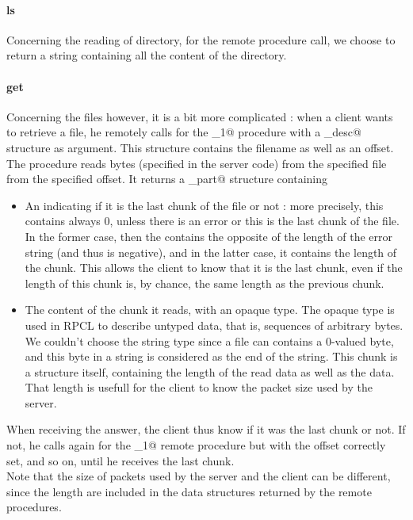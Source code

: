 \documentclass{article}
\begin{document}
\paragraph{ls} Concerning the reading of directory, for the \verb@ls@ remote procedure call, we choose to return a string containing all the content of the directory.

\paragraph{get} Concerning the files however, it is a bit more complicated : when a client wants to retrieve a file, he remotely calls for the \verb@rget_1@ procedure with a \verb@file_desc@ structure as argument. This structure contains the filename as well as an offset. The procedure reads \verb@PSIZE@ bytes (specified in the server code) from the specified file from the specified offset. It returns a \verb@file_part@ structure containing 
\begin{itemize}
\item An \verb@int@ indicating if it is the last chunk of the file or not : more precisely, this \verb@int@ contains always 0, unless there is an error or this is the last chunk of the file. In the former case, then the \verb@int@ contains the opposite of the length of the error string (and thus is negative), and in the latter case, it contains the length of the chunk. This allows the client to know that it is the last chunk, even if the length of this chunk is, by chance, the same length as the previous chunk.
\item The content of the chunk it reads, with an opaque type. The opaque type is used in RPCL to describe untyped data, that is, sequences of arbitrary bytes. We couldn't choose the string type since a file can contains a 0-valued byte, and this byte in a string is considered as the end of the string. This chunk is a structure itself, containing the length of the read data as well as the data. That length is usefull for the client to know the packet size used by the server.
\end{itemize}

When receiving the answer, the client thus know if it was the last chunk or not. If not, he calls again for the 
 \verb@rget_1@ remote procedure but with the offset correctly set, and so on, until he receives the last chunk.\\
 
Note that the size of packets used by the server and the client can be different, since the length are included in the data structures returned by the remote procedures.\\
\end{document}
